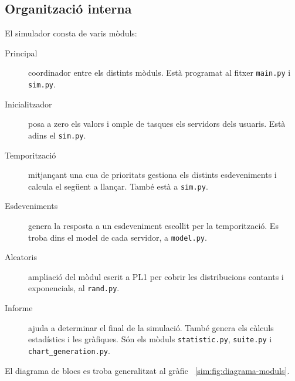 \subsection{Organització interna}

El simulador consta de varis mòduls:

\begin{description}

  \item[Principal] coordinador entre els distints mòduls. Està programat al
    fitxer \verb+main.py+ i \verb+sim.py+.

  \item[Inicialitzador] posa a zero els valors i omple de tasques els servidors
    dels usuaris. Està adins el \verb+sim.py+.

  \item[Temporització] mitjançant una cua de prioritats gestiona els distints
    esdeveniments i calcula el següent a llançar. També està a \verb+sim.py+.

  \item[Esdeveniments] genera la resposta a un esdeveniment escollit per la
    temporització. Es troba dins el model de cada servidor, a \verb+model.py+.

  \item[Aleatoris] ampliació del mòdul escrit a PL1 per cobrir les
    distribucions contants i exponencials, al \verb+rand.py+.

  \item[Informe] ajuda a determinar el final de la simulació. També genera els
    càlculs estadístics i les gràfiques. Són els mòduls \verb+statistic.py+,
    \verb+suite.py+ i \verb+chart_generation.py+.

\end{description}

El diagrama de blocs es troba generalitzat al gràfic
~\ref{sim:fig:diagrama-moduls}.


